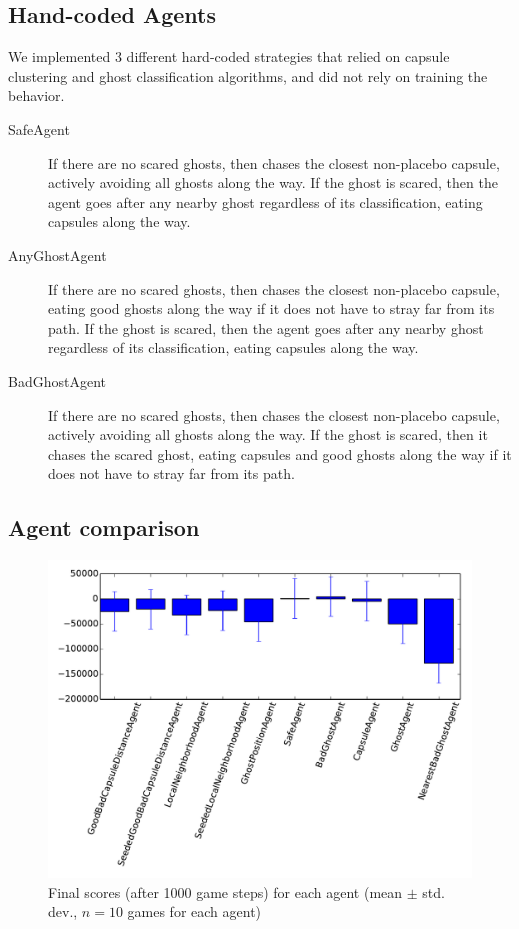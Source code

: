 \documentclass[11pt]{amsart}
\begin{document}
\subsection{Hand-coded Agents}

We implemented 3 different hard-coded strategies that relied on capsule clustering and ghost classification algorithms, and did not rely on training the behavior.
\begin{description}
	\item[SafeAgent] If there are no scared ghosts, then chases the closest non-placebo capsule, actively avoiding all ghosts along the way. If the ghost is scared, then the agent goes after any nearby ghost regardless of its classification, eating capsules along the way. 
	\item[AnyGhostAgent] If there are no scared ghosts, then chases the closest non-placebo capsule, eating good ghosts along the way if it does not have to stray far from its path. If the ghost is scared, then the agent goes after any nearby ghost regardless of its classification, eating capsules along the way. 
	\item[BadGhostAgent] If there are no scared ghosts, then chases the closest non-placebo capsule, actively avoiding all ghosts along the way. If the ghost is scared, then it chases the scared ghost, eating capsules and good ghosts along the way if it does not have to stray far from its path.
\end{description}

\subsection{Agent comparison}

\begin{figure}
	\includegraphics[width=\textwidth]{agents-finals.pdf}
	\caption{Final scores (after 1000 game steps) for each agent (mean $\pm$ std. dev., $n = 10$ games for each agent)}
\end{figure}
\end{document}
